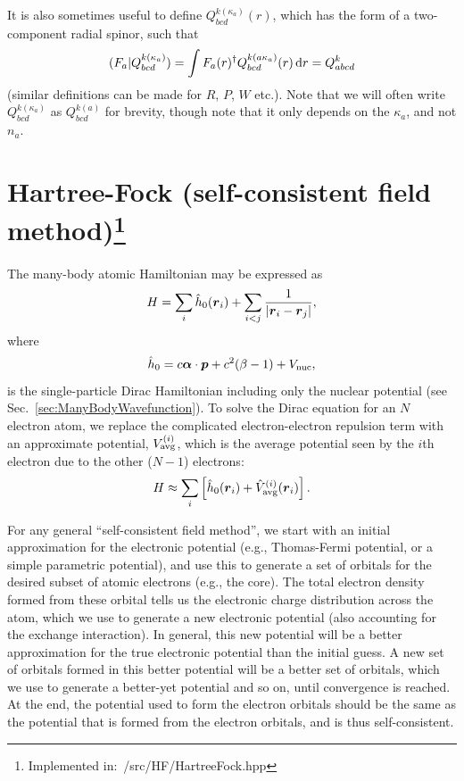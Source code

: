 \documentclass[10pt,twocolumn,a4paper]{article}%
\renewcommand{\v}[1]{\ensuremath{\boldsymbol{#1}}}		%
\newcommand{\be}{\begin{equation}}
\newcommand{\ee}{\end{equation}}
\def\d{\ensuremath{{\rm d}}}
\begin{document}
It is also sometimes useful to define $Q^{k(\kappa_a)}_{bcd}(r)$, which has the form of a two-component radial spinor, such that
\be
(F_a|Q^{k(\kappa_a)}_{bcd}) = \int F_a(r)^\dag Q^{k(a\kappa_a)}_{bcd}(r)\,\d r = Q^k_{abcd}
\ee
(similar definitions can be made for $R$, $P$, $W$ etc.).
Note that we will often write $Q^{k(\kappa_a)}_{bcd}$ as $Q^{k(a)}_{bcd}$ for brevity, though note that it only depends on the $\kappa_a$, and not $n_a$.

\section[Hartree-Fock (self-consistent field method)]{Hartree-Fock (self-consistent field method)\footnote{Implemented in:~/src/HF/HartreeFock.hpp}}


The many-body atomic Hamiltonian may be expressed as
\be\label{eq:H-manybody}
H = \sum_i \hat h_{\rm 0}(\v{r}_i) + \sum_{i<j}\frac{1}{|\v{r}_i-\v{r}_j|},
\ee
where 
\[\hat h_0 = c \v{\alpha}\cdot\v{p} + c^2(\beta-1) +  V_{\rm nuc},\]
is the single-particle Dirac Hamiltonian including only the nuclear potential (see Sec.~\ref{sec:ManyBodyWavefunction}).
To solve the Dirac equation for an $N$ electron atom, we replace the complicated electron-electron repulsion term with an approximate potential, $V_{\rm avg}^{(i)}$, 
which is the average potential seen by the $i$th electron due to the other ($N-1$) electrons:
\be
H \approx \sum_i \left[ \hat h_{\rm 0}(\v{r}_i) + \hat V_{\rm avg}^{(i)}(\v{r}_i) \right].
\ee


For any general ``self-consistent field method'', we start with an initial approximation for the electronic potential (e.g., Thomas-Fermi potential, or a simple parametric potential), and use this to generate a set of orbitals for the desired subset of atomic electrons (e.g., the core).
The total electron density formed from these orbital tells us the electronic charge distribution across the atom, which we use to generate a new electronic potential (also accounting for the exchange interaction).
In general, this new potential will be a better approximation for the true electronic potential than the initial guess.
A new set of orbitals formed in this better potential will be a better set of orbitals, which we use to generate a better-yet potential and so on, until convergence is reached.
At the end, the potential used to form the electron orbitals should be the same as the potential that is formed from the electron orbitals, and is thus self-consistent.
\end{document}
